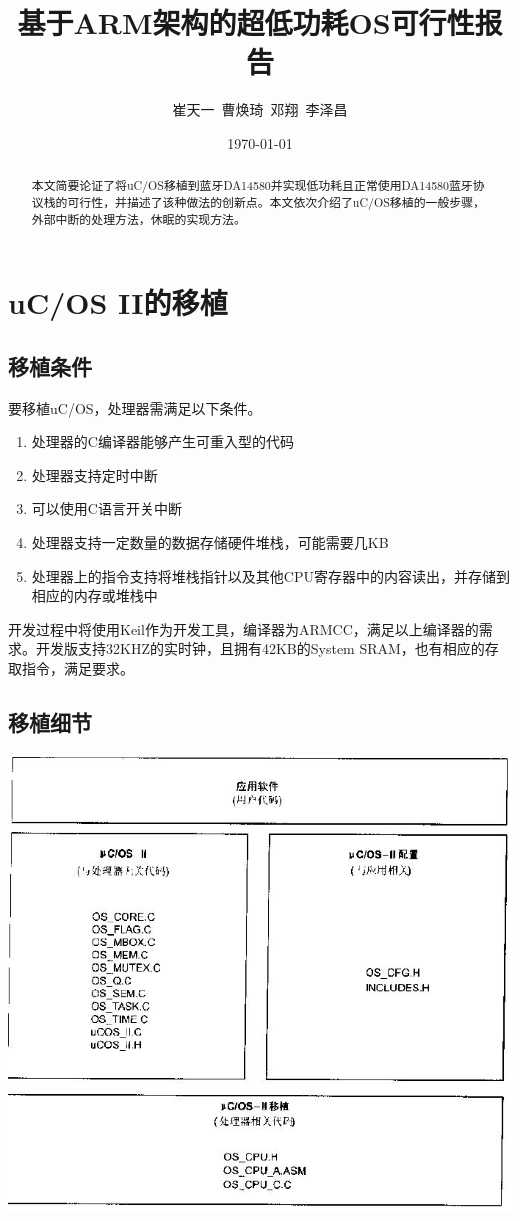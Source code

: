 \documentclass{ctexart}
\begin{document}
\title{基于ARM架构的超低功耗OS可行性报告}
\author{崔天一\ 曹焕琦\ 邓翔\ 李泽昌}
\date{\today}
\begin{abstract}
 本文简要论证了将uC/OS移植到蓝牙DA14580并实现低功耗且正常使用DA14580蓝牙协议栈的可行性，并描述了该种做法的创新点。本文依次介绍了uC/OS移植的一般步骤，外部中断的处理方法，休眠的实现方法。
\end{abstract}

\maketitle

\tableofcontents
\newpage
\section{uC/OS II的移植\cite{001}}
\subsection{移植条件}
要移植uC/OS，处理器需满足以下条件。
\begin{enumerate}
\item 处理器的C编译器能够产生可重入型的代码
\item 处理器支持定时中断
\item 可以使用C语言开关中断
\item 处理器支持一定数量的数据存储硬件堆栈，可能需要几KB
\item 处理器上的指令支持将堆栈指针以及其他CPU寄存器中的内容读出，并存储到相应的内存或堆栈中
\end{enumerate}

开发过程中将使用Keil作为开发工具，编译器为ARMCC，满足以上编译器的需求。开发版支持32KHZ的实时钟，且拥有42KB的System SRAM，也有相应的存取指令，满足要求。
\subsection{移植细节}

\centerline{\includegraphics[scale=0.65]{001}}\par
\end{document}
